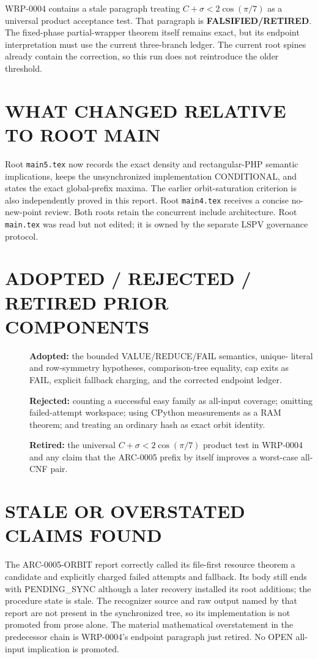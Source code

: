 \documentclass[11pt]{article}
\begin{document}
WRP-0004 contains a stale paragraph treating
$C+\sigma<2\cos(\pi/7)$ as a universal product acceptance test.  That
paragraph is \textbf{FALSIFIED/RETIRED}.  The fixed-phase partial-wrapper
theorem itself remains exact, but its endpoint interpretation must use the
current three-branch ledger.  The current root spines already contain the
correction, so this run does not reintroduce the older threshold.

\section{WHAT CHANGED RELATIVE TO ROOT MAIN}
Root \texttt{main5.tex} now records the exact density and rectangular-PHP
semantic implications, keeps the unsynchronized implementation CONDITIONAL,
and states the exact global-prefix maxima.  The earlier orbit-saturation
criterion is also independently proved in this report.  Root
\texttt{main4.tex} receives a concise no-new-point review.  Both roots retain
the concurrent include architecture.  Root \texttt{main.tex} was read but not
edited; it is owned by the separate LSPV governance protocol.

\section{ADOPTED / REJECTED / RETIRED PRIOR COMPONENTS}
\begin{description}
\item[] \textbf{Adopted:} the bounded VALUE/REDUCE/FAIL semantics, unique-
literal and row-symmetry hypotheses, comparison-tree equality, cap exits as
FAIL, explicit fallback charging, and the corrected endpoint ledger.
\item[] \textbf{Rejected:} counting a successful easy family as all-input
coverage; omitting failed-attempt workspace; using CPython measurements as a
RAM theorem; and treating an ordinary hash as exact orbit identity.
\item[] \textbf{Retired:} the universal
$C+\sigma<2\cos(\pi/7)$ product test in WRP-0004 and any claim that the
ARC-0005 prefix by itself improves a worst-case all-CNF pair.
\end{description}

\section{STALE OR OVERSTATED CLAIMS FOUND}
The ARC-0005-ORBIT report correctly called its file-first resource theorem a
candidate and explicitly charged failed attempts and fallback.  Its body still
ends with PENDING\_SYNC although a later recovery installed its root additions;
the procedure state is stale.  The recognizer source and raw output named by
that report are not present in the synchronized tree, so its implementation
is not promoted from prose alone.  The material mathematical overstatement in
the predecessor chain is WRP-0004's endpoint paragraph just retired.  No OPEN
all-input implication is promoted.
\end{document}
